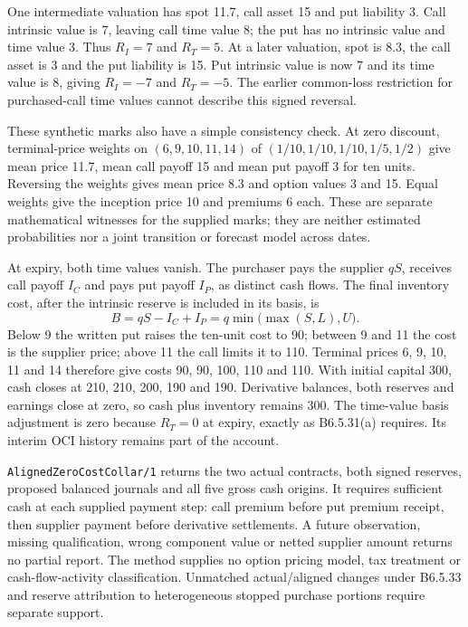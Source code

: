 One intermediate valuation has spot 11.7, call asset 15 and put liability 3.
Call intrinsic value is 7, leaving call time value 8; the put has no intrinsic
value and time value 3. Thus \(R_I=7\) and \(R_T=5\). At a later valuation,
spot is 8.3, the call asset is 3 and the put liability is 15. Put intrinsic
value is now 7 and its time value is 8, giving \(R_I=-7\) and
\(R_T=-5\). The earlier common-loss restriction for purchased-call time
values cannot describe this signed reversal.

These synthetic marks also have a simple consistency check. At zero discount,
terminal-price weights on \((6,9,10,11,14)\) of
\((1/10,1/10,1/10,1/5,1/2)\) give mean price 11.7, mean call payoff 15
and mean put payoff 3 for ten units. Reversing the weights gives mean price
8.3 and option values 3 and 15. Equal weights give the inception price 10 and
premiums 6 each. These are separate mathematical witnesses for the supplied
marks; they are neither estimated probabilities nor a joint transition or
forecast model across dates.

At expiry, both time values vanish. The purchaser pays the supplier \(qS\),
receives call payoff \(I_C\) and pays put payoff \(I_P\), as distinct cash
flows. The final inventory cost, after the intrinsic reserve is included in
its basis, is
\[
 B=qS-I_C+I_P=q\min\!\bigl(\max(S,L),U\bigr).
\]
Below 9 the written put raises the ten-unit cost to 90; between 9 and 11 the
cost is the supplier price; above 11 the call limits it to 110. Terminal prices
6, 9, 10, 11 and 14 therefore give costs 90, 90, 100, 110 and 110. With initial
capital 300, cash closes at 210, 210, 200, 190 and 190. Derivative balances,
both reserves and earnings close at zero, so cash plus inventory remains 300.
The time-value basis adjustment is zero because \(R_T=0\) at expiry, exactly
as B6.5.31(a) requires. Its interim OCI history remains part of the account.

\texttt{AlignedZeroCostCollar/1} returns the two actual contracts, both signed
reserves, proposed balanced journals and all five gross cash origins. It
requires sufficient cash at each supplied payment step: call premium before
put premium receipt, then supplier payment before derivative settlements.
A future observation, missing qualification, wrong component value or netted
supplier amount returns no partial report. The method supplies no option
pricing model, tax treatment or cash-flow-activity classification. Unmatched
actual/aligned changes under B6.5.33 and reserve attribution to heterogeneous
stopped purchase portions require separate support.
